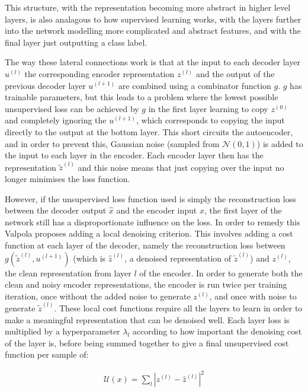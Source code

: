 This structure, with the representation becoming more abstract in higher level layers, is also analagous to how supervised learning works, with the layers 
further into the network modelling more complicated and abstract features, and with the final layer just outputting a class label.

The way these lateral connections work is that
at the input to each decoder layer $u^{(l)}$ the corresponding encoder representation $z^{(l)}$ and the output of the previous decoder layer $u^{(l+1)}$ are combined
using a combinator function $g$. $g$ has trainable parameters, but this leads to a problem where the lowest possible unsupervised loss can be 
achieved by $g$ in the first layer learning to copy $z^{(0)}$ and completely ignoring the $u^{(l+1)}$, which corresponds to copying the input directly to the output at the bottom layer.
This short circuits the autoencoder, and in order to prevent this, Gaussian noise (sampled from $\mathcal{N}(0, 1)$) is added to the input to each layer 
in the encoder. Each encoder layer then has the representation $\tilde{z}^{(l)}$ and this noise means that just copying over the input no longer minimises the loss function. 

However, if the unsupervised loss function used is simply the reconstruction loss between the decoder output $\hat{x}$ and the encoder input $x$, the first layer of 
the network still has a disproportionate
influence on the loss. In order to remedy this Valpola proposes adding a local denoising criterion. This involves adding a cost function at each layer of the decoder,
namely the reconstruction loss between $g(\tilde{z}^{(l)}, u^{(l+1)})$ (which is $\hat{z}^{(l)}$, a denoised representation of $\tilde{z}^{(l)}$) and $z^{(l)}$, the clean 
representation from layer $l$ of the encoder. In order to generate both the clean and noisy encoder representations, the encoder is run twice per training iteration,
once without the added noise to generate $z^{(l)}$, and once with noise to generate $\tilde{z}^{(l)}$. These local cost functions require all the layers to learn in order
to make a meaningful representation that can be denoised well. Each layer loss is multiplied by a hyperparameter $\lambda_{l}$ according to how important the denoising cost
of the layer is, before being summed together to give a final unsupervised cost function per sample of:

\begin{align}
  \mathcal{U}(x) = \sum_{l} |z^{(l)} - \hat{z}^{(l)}|^{2}
\end{align}

